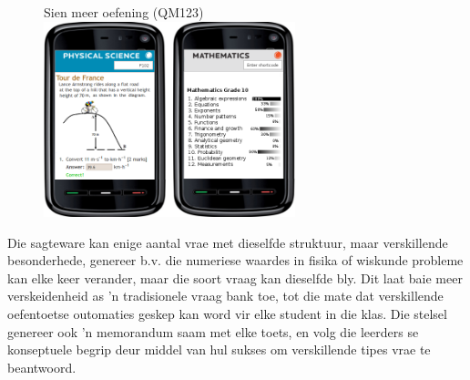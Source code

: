 {\begin{figure}[H]
\begin{center}
Sien meer oefening  (QM123)\\ 
\includegraphics[width=0.65\textwidth]{../title_images/practicephones.png}
\end{center}
\end{figure}
\par
Die sagteware kan enige aantal vrae met dieselfde struktuur, maar verskillende besonderhede, genereer b.v. die numeriese waardes in fisika of wiskunde probleme kan elke keer verander, maar die soort vraag kan dieselfde bly. Dit laat baie meer verskeidenheid as 'n tradisionele vraag bank toe, tot die mate dat verskillende oefentoetse outomaties geskep kan word vir elke student in die klas. Die stelsel genereer ook 'n memorandum saam met elke toets, en volg die leerders se konseptuele begrip deur middel van hul sukses om verskillende tipes vrae te beantwoord. 
\par

}
